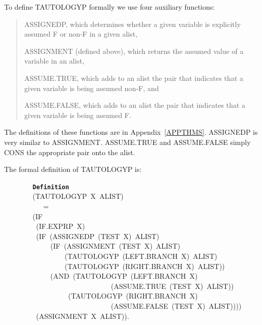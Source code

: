 \documentclass[11pt]{book}
\newenvironment{pubasis}{\begin{flushleft}\ttfamily\small}{\normalsize\rmfamily\end{flushleft}}
\newenvironment{pubcrown}{\begin{quote}}{\end{quote}}
\newcommand{\axiomordefinition}[1]{\vspace{6pt}\texttt{\textbf{#1}}}
\begin{document}
To  define TAUTOLOGYP formally we use four auxiliary functions:
\begin{pubcrown}
ASSIGNEDP, which  determines whether a given variable is explicitly
assumed F or non-F in a given alist,

ASSIGNMENT (defined above), which returns  the assumed value
of a variable in an alist,

AS\-SUME.TRUE, which adds to an alist the pair that indicates that
a given variable is being assumed non-F, and

AS\-SUME.FALSE, which adds to an alist  the pair that indicates that
a given variable is being assumed F.
\end{pubcrown}

The definitions of these functions are in Appendix~\ref{APPTHMS}.  ASSIGNEDP is
very similar to ASSIGN\-MENT.  AS\-SUME.TRUE and AS\-SUME.FALSE simply
CONS the appropriate pair onto the alist.

The formal definition of TAUTOLOGYP is:
\begin{pubasis}
~~~~~~~~\axiomordefinition{Definition}\\
~~~~~~~~(TAUTOLOGYP~X~ALIST)\\
~~~~~~~~~~~=\\
~~~~~~~~(IF\\
~~~~~~~~~(IF.EXPRP~X)\\
~~~~~~~~~(IF~(ASSIGNEDP~(TEST~X)~ALIST)\\
~~~~~~~~~~~~~(IF~(ASSIGNMENT~(TEST~X)~ALIST)\\
~~~~~~~~~~~~~~~~~(TAU\-TOL\-OGYP~(LEFT.BRANCH~X)~ALIST)\\
~~~~~~~~~~~~~~~~~(TAU\-TOL\-OGYP~(RIGHT.BRANCH~X)~ALIST))\\
~~~~~~~~~~~~~(AND~(TAU\-TOL\-OGYP~(LEFT.BRANCH~X)\\
~~~~~~~~~~~~~~~~~~~~~~~~~~~~~~(AS\-SUME.TRUE~(TEST~X)~ALIST))\\
~~~~~~~~~~~~~~~~~~(TAU\-TOL\-OGYP~(RIGHT.BRANCH~X)\\
~~~~~~~~~~~~~~~~~~~~~~~~~~~~~~(AS\-SUME.FALSE~(TEST~X)~ALIST))))\\
~~~~~~~~~(ASSIGNMENT~X~ALIST)).\\
\end{pubasis}
\end{document}
